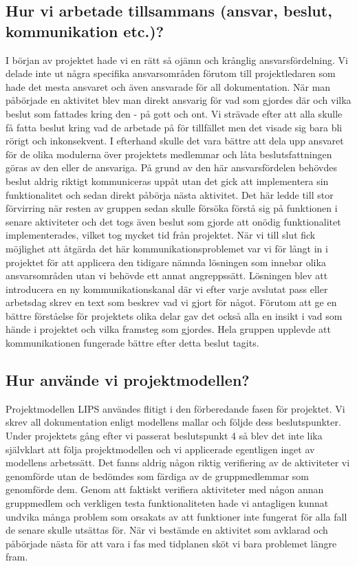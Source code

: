 \documentclass{article}
\begin{document}
\subsection{Hur vi arbetade tillsammans (ansvar, beslut, kommunikation etc.)?}
I början av projektet hade vi en rätt så ojämn och krånglig ansvarsfördelning. Vi delade inte ut några specifika ansvarsområden förutom till projektledaren som hade det mesta ansvaret och även ansvarade för all dokumentation. När man påbörjade en aktivitet blev man direkt ansvarig för vad som gjordes där och vilka beslut som fattades kring den - på gott och ont. Vi strävade efter att alla skulle få fatta beslut kring vad de arbetade på för tillfället men det visade sig bara bli rörigt och inkonsekvent. I efterhand skulle det vara bättre att dela upp ansvaret för de olika modulerna över projektets medlemmar och låta beslutsfattningen göras av den eller de ansvariga.
\newline\newline
På grund av den här ansvarsfördelen behövdes beslut aldrig riktigt kommuniceras uppåt utan det gick att implementera sin funktionalitet och sedan direkt påbörja nästa aktivitet. Det här ledde till stor förvirring när resten av gruppen sedan skulle försöka förstå sig på funktionen i senare aktiviteter och det togs även beslut som gjorde att onödig funktionalitet implementerades, vilket tog mycket tid från projektet. När vi till slut fick möjlighet att åtgärda det här kommunikationsproblemet var vi för långt in i projektet för att applicera den tidigare nämnda lösningen som innebar olika ansvarsområden utan vi behövde ett annat angreppssätt. Lösningen blev att introducera en ny kommunikationskanal där vi efter varje avslutat pass eller arbetsdag skrev en text som beskrev vad vi gjort för något. Förutom att ge en bättre förståelse för projektets olika delar gav det också alla en insikt i vad som hände i projektet och vilka framsteg som gjordes. Hela gruppen upplevde att kommunikationen fungerade bättre efter detta beslut tagits.

\subsection{Hur använde vi projektmodellen?}
Projektmodellen LIPS användes flitigt i den förberedande fasen för projektet. Vi skrev all dokumentation enligt modellens mallar och följde dess beslutspunkter. Under projektets gång efter vi passerat beslutspunkt 4 så blev det inte lika självklart att följa projektmodellen och vi applicerade egentligen inget av modellens arbetssätt.
\newline\newline
Det fanns aldrig någon riktig verifiering av de aktiviteter vi genomförde utan de bedömdes som färdiga av de gruppmedlemmar som genomförde dem. Genom att faktiskt verifiera aktiviteter med någon annan gruppmedlem och verkligen testa funktionaliteten hade vi antagligen kunnat undvika många problem som orsakats av att funktioner inte fungerat för alla fall de senare skulle utsättas för. När vi bestämde en aktivitet som avklarad och påbörjade nästa för att vara i fas med tidplanen sköt vi bara problemet längre fram.
\end{document}
